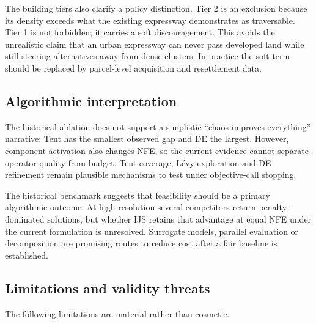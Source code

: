 \documentclass[preprint,12pt]{elsarticle}
\begin{document}
The building tiers also clarify a policy distinction. Tier 2 is an exclusion because its density exceeds what the existing expressway demonstrates as traversable. Tier 1 is not forbidden; it carries a soft discouragement. This avoids the unrealistic claim that an urban expressway can never pass developed land while still steering alternatives away from dense clusters. In practice the soft term should be replaced by parcel-level acquisition and resettlement data.

\subsection{Algorithmic interpretation}

The historical ablation does not support a simplistic ``chaos improves everything'' narrative: Tent has the smallest observed gap and DE the largest. However, component activation also changes NFE, so the current evidence cannot separate operator quality from budget. Tent coverage, L\'evy exploration and DE refinement remain plausible mechanisms to test under objective-call stopping.

The historical benchmark suggests that feasibility should be a primary algorithmic outcome. At high resolution several competitors return penalty-dominated solutions, but whether IJS retains that advantage at equal NFE under the current formulation is unresolved. Surrogate models, parallel evaluation or decomposition are promising routes to reduce cost after a fair baseline is established.

\subsection{Limitations and validity threats}\label{sec:limitations}

The following limitations are material rather than cosmetic.
\end{document}
